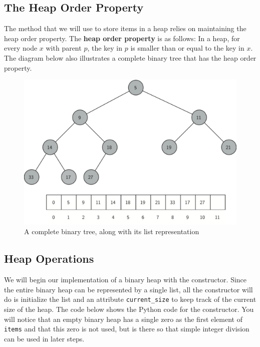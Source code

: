 \documentclass[11pt]{article}
\begin{document}
\hypertarget{the-heap-order-property}{%
\subsection{The Heap Order Property}\label{the-heap-order-property}}

The method that we will use to store items in a heap relies on
maintaining the heap order property. The \textbf{heap order property} is
as follows: In a heap, for every node \(x\) with parent \(p\), the key
in \(p\) is smaller than or equal to the key in \(x\). The diagram below
also illustrates a complete binary tree that has the heap order
property.

\begin{figure}
\centering
\includegraphics{figures/heap-order.png}
\caption{A complete binary tree, along with its list representation}
\end{figure}

\hypertarget{heap-operations}{%
\subsection{Heap Operations}\label{heap-operations}}

We will begin our implementation of a binary heap with the constructor.
Since the entire binary heap can be represented by a single list, all
the constructor will do is initialize the list and an attribute
\texttt{current\_size} to keep track of the current size of the heap.
The code below shows the Python code for the constructor. You will
notice that an empty binary heap has a single zero as the first element
of \texttt{items} and that this zero is not used, but is there so that
simple integer division can be used in later steps.
\end{document}
